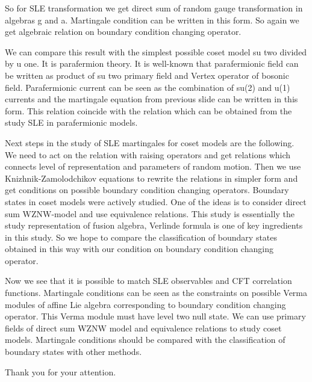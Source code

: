 \documentclass{article}
\begin{document}
So for SLE transformation we get direct sum of random gauge transformation in algebras g and a. Martingale condition can be written in this form. So again we get algebraic relation on boundary condition changing operator. 

We can compare this result with the simplest possible coset model su two divided by u one. It is parafermion theory. It is well-known that parafermionic field can be written as product of su two primary field and Vertex operator of bosonic field. 
Parafermionic current can be seen as the combination of su(2) and u(1) currents and the martingale equation from previous slide can be written in this form. This relation coincide with the relation which can be obtained from the study SLE in  parafermionic models. 

Next steps in the study of SLE martingales for coset models  are the following. We need to act on the relation with raising operators and get relations which connects level of representation and parameters of random motion. Then we use Knizhnik-Zamolodchikov equations to rewrite the relations in simpler form and get conditions on possible boundary condition changing operators. 
Boundary states in coset models were actively studied. One of the ideas is to consider direct sum WZNW-model and use equivalence relations. This study is essentially the study representation of fusion algebra, Verlinde formula is one of key ingredients in this study. So we hope to compare the classification of boundary states obtained in this way with our condition on boundary condition changing operator. 

Now we see that it is possible to match SLE observables and CFT correlation functions. Martingale conditions can be seen as the constraints on possible Verma modules of affine Lie algebra corresponding to boundary condition changing operator. This Verma module must have level two null state. 
We can use primary fields of direct sum WZNW model and equivalence relations to study coset models. 
Martingale conditions should be compared with the classification of boundary states with other methods.

Thank you for your attention. 
\end{document}
